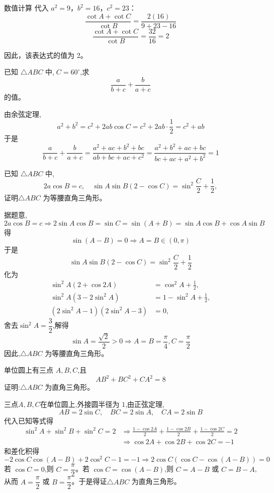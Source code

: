 \begin{questions}
\begin{solution}
数值计算
代入 $a^2 = 9$，$b^2 = 16$，$c^2 = 23$：
\[ \frac{\cot A + \cot C}{\cot B} = \frac{2(16)}{9 + 23 - 16} \]
\[ \frac{\cot A + \cot C}{\cot B} = \frac{32}{16} = 2 \]

因此，该表达式的值为 2。
\end{solution}
    \question 已知 $\triangle ABC$ 中,$\;C = 60^\circ$,求
    \[
    \frac{a}{b+c} + \frac{b}{a+c}
    \]
    的值。
    \begin{solution}
        由余弦定理,
        \[
        a^2 + b^2 = c^2+ 2ab \cos C = c^2+2ab \cdot \frac{1}{2} = c^2+ ab
        \]
        于是
        \[
        \frac{a}{b+c} + \frac{b}{a+c}
        = \frac{a^2 + ac + b^2 + bc}{ab+bc+ac+c^2} 
        = \frac{a^2 + b^2 + ac + bc}{bc+ac+a^2+b^2} 
        = 1
        \]
    \end{solution}

    \question 已知 $\triangle ABC$ 中,
    \[
    2a \cos B = c, \quad \sin A \sin B (2-\cos C) = \sin^2 \frac{C}{2} + \frac{1}{2},
    \]
    证明$\triangle ABC$ 为等腰直角三角形。
    \begin{solution}
        据题意,
        \[
        2a \cos B = c \Rightarrow 2 \sin A \cos B = \sin C = \sin(A+B) = \sin A \cos B + \cos A \sin B
        \]
        得
        \[
        \sin(A-B)= 0 \Rightarrow A=B \in (0,\pi)
        \]
        于是
        \[
        \sin A \sin B (2 - \cos C) = \sin^2 \frac{C}{2} + \frac{1}{2}
        \]
        化为
        \begin{align*}
            \sin^2 A (2 + \cos 2A) &= \cos^2 A + \frac{1}{2}, \\
            \sin^2 A (3 - 2 \sin^2 A) &= 1 - \sin^2 A + \frac{1}{2}, \\
            (2 \sin^2 A - 1)(2 \sin^2 A - 3) &= 0,
        \end{align*}
        舍去$\sin^2 A=\dfrac{3}{2}$,解得
        \[
        \sin A = \frac{\sqrt{2}}{2} >0\Rightarrow 
        A = B = \frac{\pi}{4}, C = \frac{\pi}{2}
        \]
        因此,$\triangle ABC$ 为等腰直角三角形。
    \end{solution}

    \question 单位圆上有三点 $A,B,C$,且
    \[
    AB^2+BC^2+CA^2=8
    \]
    证明:$\triangle ABC$ 为直角三角形。
    \begin{solution}
        三点$A,B,C$在单位圆上,外接圆半径为 $1$,由正弦定理,
        \[
        AB=2\sin C,\quad BC=2\sin A,\quad CA=2\sin B
        \]
        代入已知等式得
        \begin{align*}
        \sin^2 A + \sin^2 B + \sin^2 C = 2 &\Rightarrow \frac{1-\cos 2A}{2} + \frac{1-\cos 2B}{2} + \frac{1-\cos 2C}{2} = 2 \\ 
        &\Rightarrow \cos 2A + \cos 2B + \cos 2C = -1
        \end{align*}
        和差化积得
        \[
        -2\cos C\cos(A-B)+2\cos^2C-1=-1 \Rightarrow 2\cos C(\cos C-\cos(A-B))=0
        \]
        若 $\cos C=0$,则 $C=\dfrac{\pi}{2}$。若 $\cos C=\cos(A-B)$,则 $C=A-B$ 或 $C=B-A$,从而 $A=\dfrac{\pi}{2}$ 或 $B=\dfrac{\pi}{2}$。于是得证$\triangle ABC$ 为直角三角形。
    \end{solution}


\end{questions}
